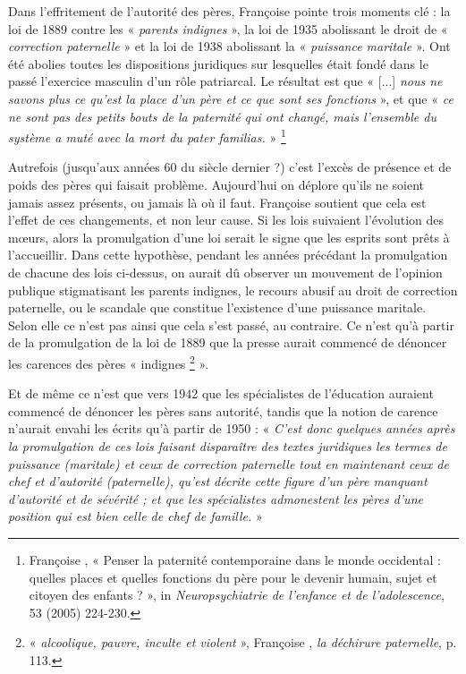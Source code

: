  Dans l'effritement de l'autorité des pères, Françoise  pointe trois moments clé : la loi de 1889 contre les « \emph{parents indignes} », la loi de 1935 abolissant le droit de « \emph{correction paternelle} » et la loi de 1938 abolissant la « \emph{puissance maritale} ». Ont été abolies toutes les dispositions juridiques sur lesquelles était fondé dans le passé l'exercice masculin d'un rôle patriarcal. Le résultat est que « [...] \emph{nous ne savons plus ce qu'est la place d'un père et ce que sont ses fonctions} », et que « \emph{ce ne sont pas des petits bouts de la paternité qui ont changé, mais l'ensemble du système a muté avec la mort du \emph{pater familias}.} »%
\footnote{Françoise , « Penser la paternité contemporaine dans le monde occidental : quelles places et quelles fonctions du père pour le devenir humain, sujet et citoyen des enfants ? », in \emph{Neuropsychiatrie de l'enfance et de l'adolescence}, 53 (2005) 224-230.} 

 Autrefois (jusqu'aux années 60 du siècle dernier ?) c'est l'excès de présence et de poids des pères qui faisait problème. Aujourd'hui on déplore qu'ils ne soient jamais assez présents, ou jamais là où il faut. Françoise  soutient que cela est l'effet de ces changements, et non leur cause. Si les lois suivaient l'évolution des mœurs, alors la promulgation d'une loi serait le signe que les esprits sont prêts à l'accueillir. Dans cette hypothèse, pendant les années précédant la promulgation de chacune des lois ci-dessus, on aurait dû observer un mouvement de l'opinion publique stigmatisant les parents indignes, le recours abusif au droit de correction paternelle, ou le scandale que constitue l'existence d'une puissance maritale. Selon elle ce n'est pas ainsi que cela s'est passé, au contraire. Ce n'est qu'à partir de la promulgation de la loi de 1889 que la presse aurait commencé de dénoncer les carences des pères « indignes%
\footnote{« \emph{alcoolique, pauvre, inculte et violent} », Françoise , \emph{la déchirure paternelle}, p. 113.} 
 ».

 Et de même ce n'est que vers 1942 que les spécialistes de l'éducation auraient commencé de dénoncer les pères sans autorité, tandis que la notion de carence n'aurait envahi les écrits qu'à partir de 1950 : « \emph{C'est donc quelques années après la promulgation de ces lois faisant disparaître des textes juridiques les termes de puissance (maritale) et ceux de correction paternelle tout en maintenant ceux de chef et d'autorité (paternelle), qu'est décrite cette figure d'un père manquant d'autorité et de sévérité ; et que les spécialistes admonestent les pères d'une position qui est bien celle de chef de famille.} » 

